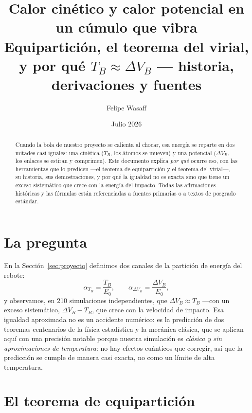 \documentclass[11pt,a4paper]{article}
\title{\textbf{Calor cinético y calor potencial en un cúmulo que vibra}\\
\large Equipartición, el teorema del virial, y por qué
$T_B \approx \Delta V_B$ --- historia, derivaciones y fuentes}
\author{Felipe Wasaff}
\date{Julio 2026}
\begin{document}
\maketitle

\begin{abstract}
Cuando la bola de nuestro proyecto se calienta al chocar, esa energía se
reparte en dos mitades casi iguales: una cinética ($T_B$, los átomos se
mueven) y una potencial ($\Delta V_B$, los enlaces se estiran y comprimen).
Este documento explica \emph{por qué} ocurre eso, con las herramientas que
lo predicen ---el teorema de equipartición y el teorema del virial---, su
historia, sus demostraciones, y por qué la igualdad no es exacta sino que
tiene un exceso sistemático que crece con la energía del impacto. Todas las
afirmaciones históricas y las fórmulas están referenciadas a fuentes
primarias o a textos de posgrado estándar.
\end{abstract}

\tableofcontents

\section{La pregunta}

En la Sección~\ref{sec:proyecto} definimos dos canales de la partición de
energía del rebote:
\[ \alpha_{T_B} = \frac{T_B}{E_0}, \qquad
   \alpha_{\Delta V_B} = \frac{\Delta V_B}{E_0}, \]
y observamos, en 210 simulaciones independientes, que
$\Delta V_B \approx T_B$ ---con un exceso sistemático,
$\Delta V_B - T_B$, que crece con la velocidad de impacto. Esa igualdad
aproximada no es un accidente numérico: es la predicción de dos teoremas
centenarios de la física estadística y la mecánica clásica, que se aplican
aquí con una precisión notable porque nuestra simulación es
\emph{clásica y sin aproximaciones de temperatura}: no hay efectos
cuánticos que corregir, así que la predicción se cumple de manera casi
exacta, no como un límite de alta temperatura.

\section{El teorema de equipartición}
\label{sec:equiparticion_teo}
\end{document}
